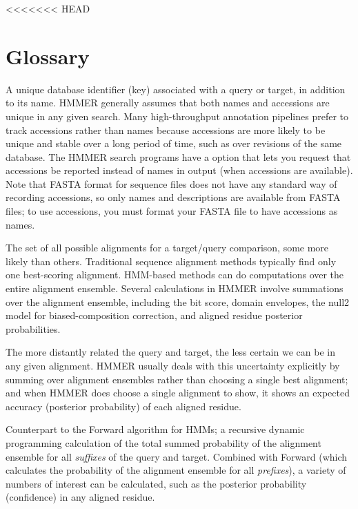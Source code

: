 <<<<<<< HEAD

\section{Glossary}
\setcounter{footnote}{0}

\begin{wideitem}

\item[\textbf{accession}] A unique database identifier (key)
  associated with a query or target, in addition to its name. HMMER
  generally assumes that both names and accessions are unique in any
  given search. Many high-throughput annotation pipelines prefer to
  track accessions rather than names because accessions are more
  likely to be unique and stable over a long period of time, such as
  over revisions of the same database. The HMMER search programs have
  a  option that lets you request that accessions be
  reported instead of names in output (when accessions are
  available). Note that FASTA format for sequence files does not have
  any standard way of recording accessions, so only names and
  descriptions are available from FASTA files; to use accessions, you
  must format your FASTA file to have accessions as names.

\item[\textbf{alignment ensemble}] The set of all possible alignments
  for a target/query comparison, some more likely than others.
  Traditional sequence alignment methods typically find only one
  best-scoring alignment. HMM-based methods can do computations over
  the entire alignment ensemble. Several calculations in HMMER involve
  summations over the alignment ensemble, including the bit score,
  domain envelopes, the null2 model for biased-composition correction,
  and aligned residue posterior probabilities.

\item[\textbf{alignment uncertainty}] The more distantly related the
  query and target, the less certain we can be in any given
  alignment. HMMER usually deals with this uncertainty explicitly by
  summing over alignment ensembles rather than choosing a single best
  alignment; and when HMMER does choose a single alignment to show, it
  shows an expected accuracy (posterior probability) of each aligned
  residue.

\item[\textbf{Backward algorithm}] Counterpart to the Forward
  algorithm for HMMs; a recursive dynamic programming calculation of
  the total summed probability of the alignment ensemble for all
  \emph{suffixes} of the query and target. Combined with Forward
  (which calculates the probability of the alignment ensemble for all
  \emph{prefixes}), a variety of numbers of interest can be
  calculated, such as the posterior probability (confidence) in any
  aligned residue.


\end{wideitem}
